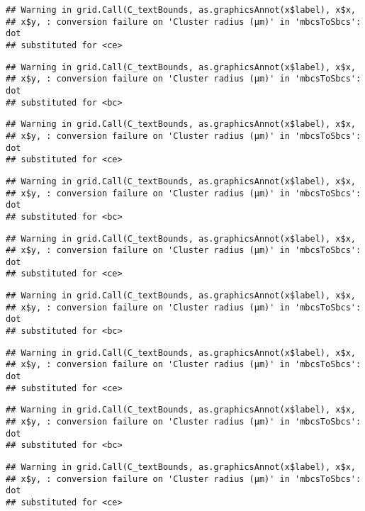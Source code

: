 \documentclass[]{article}
\begin{document}
\begin{verbatim}
## Warning in grid.Call(C_textBounds, as.graphicsAnnot(x$label), x$x,
## x$y, : conversion failure on 'Cluster radius (μm)' in 'mbcsToSbcs': dot
## substituted for <ce>
\end{verbatim}

\begin{verbatim}
## Warning in grid.Call(C_textBounds, as.graphicsAnnot(x$label), x$x,
## x$y, : conversion failure on 'Cluster radius (μm)' in 'mbcsToSbcs': dot
## substituted for <bc>
\end{verbatim}

\begin{verbatim}
## Warning in grid.Call(C_textBounds, as.graphicsAnnot(x$label), x$x,
## x$y, : conversion failure on 'Cluster radius (μm)' in 'mbcsToSbcs': dot
## substituted for <ce>
\end{verbatim}

\begin{verbatim}
## Warning in grid.Call(C_textBounds, as.graphicsAnnot(x$label), x$x,
## x$y, : conversion failure on 'Cluster radius (μm)' in 'mbcsToSbcs': dot
## substituted for <bc>
\end{verbatim}

\begin{verbatim}
## Warning in grid.Call(C_textBounds, as.graphicsAnnot(x$label), x$x,
## x$y, : conversion failure on 'Cluster radius (μm)' in 'mbcsToSbcs': dot
## substituted for <ce>
\end{verbatim}

\begin{verbatim}
## Warning in grid.Call(C_textBounds, as.graphicsAnnot(x$label), x$x,
## x$y, : conversion failure on 'Cluster radius (μm)' in 'mbcsToSbcs': dot
## substituted for <bc>
\end{verbatim}

\begin{verbatim}
## Warning in grid.Call(C_textBounds, as.graphicsAnnot(x$label), x$x,
## x$y, : conversion failure on 'Cluster radius (μm)' in 'mbcsToSbcs': dot
## substituted for <ce>
\end{verbatim}

\begin{verbatim}
## Warning in grid.Call(C_textBounds, as.graphicsAnnot(x$label), x$x,
## x$y, : conversion failure on 'Cluster radius (μm)' in 'mbcsToSbcs': dot
## substituted for <bc>
\end{verbatim}

\begin{verbatim}
## Warning in grid.Call(C_textBounds, as.graphicsAnnot(x$label), x$x,
## x$y, : conversion failure on 'Cluster radius (μm)' in 'mbcsToSbcs': dot
## substituted for <ce>
\end{verbatim}
\end{document}
